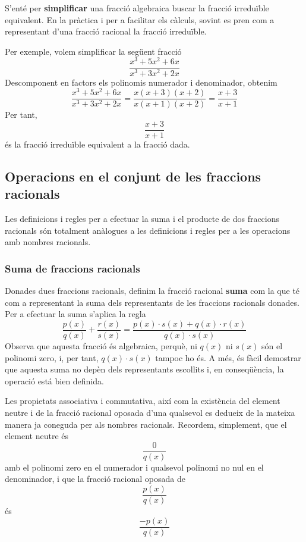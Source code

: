 S'enté per \textbf{simplificar} una fracció algebraica buscar
la fracció irreduïble equivalent. En la pràctica i per a facilitar
els càlculs, sovint es pren com a representant d’una fracció
racional la fracció irreduïble.

Per exemple, volem simplificar la següent fracció\begin{equation*}
\frac{x^{3}+5x^{2}+6x}{x^{3}+3x^{2}+2x}
\end{equation*}Descomponent en factors els polinomis numerador i denominador, obtenim\begin{equation*}
\frac{x^{3}+5x^{2}+6x}{x^{3}+3x^{2}+2x}=\frac{x(x+3)(x+2)}{x(x+1)(x+2)}=\frac{x+3}{x+1}
\end{equation*}Per tant,\begin{equation*}
\frac{x+3}{x+1}
\end{equation*}és la fracció irreduïble equivalent a la fracció dada.

\subsection{Operacions en el conjunt de les fraccions racionals}

Les definicions i regles per a efectuar la suma i el producte de dos
fraccions racionals són totalment anàlogues a les definicions i
regles per a les operacions amb nombres racionals.

\subsubsection{Suma de fraccions racionals}

Donades dues fraccions racionals, definim la fracció racional \textbf{suma} com la que té com a representant la suma dels representants de
les fraccions racionals donades. Per a efectuar la suma s'aplica la regla\begin{equation*}
\frac{p(x)}{q(x)}+\frac{r(x)}{s(x)}=\frac{p(x)\cdot s(x)+q(x)\cdot r(x)}{q(x)\cdot s(x)}
\end{equation*}Observa que aquesta fracció és algebraica, perquè, ni $q(x)$ ni $s(x)$ són
el polinomi zero, i, per tant, $q(x)\cdot s(x)$ tampoc ho és. A més,
és fàcil demostrar que aquesta suma no depèn dels representants
escollits i, en conseqüència, la operació está bien definida.

Les propietats associativa i commutativa, així com la existència del
element neutre i de la fracció racional oposada d’una qualsevol es
dedueix de la mateixa manera ja coneguda per als nombres racionals.
Recordem, simplement, que el element neutre és\begin{equation*}
\frac{0}{q(x)}
\end{equation*}amb el polinomi zero en el numerador i qualsevol polinomi no nul en el
denominador, i que la fracció racional oposada de\begin{equation*}
\frac{p(x)}{q(x)}
\end{equation*}és\begin{equation*}
\frac{-p(x)}{q(x)}
\end{equation*}

